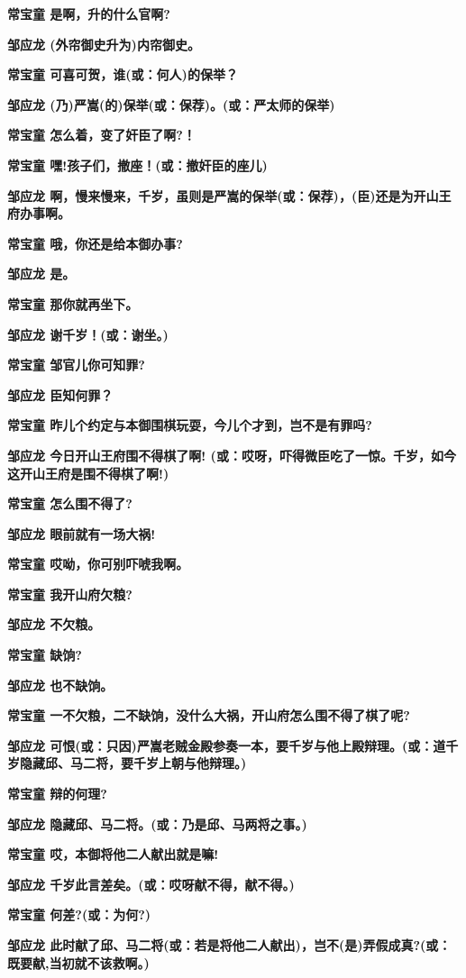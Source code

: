 \textbf{常宝童 是啊，升的什么官啊?}

\textbf{邹应龙 (外帘御史升为)内帘御史。}

\textbf{常宝童 可喜可贺，谁(或：何人)的保举？}

\textbf{邹应龙 (乃)严嵩(的)保举(或：保荐)。(或：严太师的保举)}

\textbf{常宝童 怎么着，变了奸臣了啊?！}

\textbf{常宝童 嘿!孩子们，撤座！(或：撤奸臣的座儿)}

\textbf{邹应龙
啊，慢来慢来，千岁，虽则是严嵩的保举(或：保荐)，(臣)还是为开山王府办事啊。}

\textbf{常宝童 哦，你还是给本御办事?}

\textbf{邹应龙 是。}

\textbf{常宝童 那你就再坐下。}

\textbf{邹应龙 谢千岁！(或：谢坐。)}

\textbf{常宝童 邹官儿你可知罪?}

\textbf{邹应龙 臣知何罪？}

\textbf{常宝童 昨儿个约定与本御围棋玩耍，今儿个才到，岂不是有罪吗?}

\textbf{邹应龙 今日开山王府围不得棋了啊!
(或：哎呀，吓得微臣吃了一惊。千岁，如今这开山王府是围不得棋了啊!)}

\textbf{常宝童 怎么围不得了?}

\textbf{邹应龙 眼前就有一场大祸!}

\textbf{常宝童 哎呦，你可别吓唬我啊。}

\textbf{常宝童 我开山府欠粮?}

\textbf{邹应龙 不欠粮。}

\textbf{常宝童 缺饷?}

\textbf{邹应龙 也不缺饷。}

\textbf{常宝童
一不欠粮，二不缺饷，没什么大祸，开山府怎么围不得了棋了呢?}

\textbf{邹应龙
可恨(或：只因)严嵩老贼金殿参奏一本，要千岁与他上殿辩理。(或：道千岁隐藏邱、马二将，要千岁上朝与他辩理。)}

\textbf{常宝童 辩的何理?}

\textbf{邹应龙 隐藏邱、马二将。(或：乃是邱、马两将之事。)}

\textbf{常宝童 哎，本御将他二人献出就是嘛!}

\textbf{邹应龙 千岁此言差矣。(或：哎呀献不得，献不得。)}

\textbf{常宝童 何差?(或：为何?)}

\textbf{邹应龙
此时献了邱、马二将(或：若是将他二人献出)，岂不(是)弄假成真?(或：既要献,当初就不该救啊。)}


